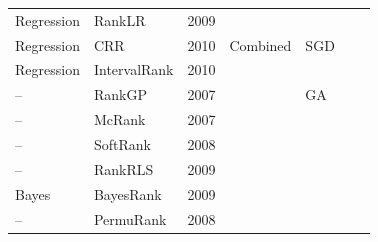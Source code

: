 \begin{table}[ht]
\begin{tabular}{|l|l|l|l|l|l|l|}
      Regression & RankLR\cite{sculley2009large} & 2009 & & & &\\
      Regression & CRR\cite{sculley2010combined} & 2010 & Combined & SGD & &\\
      Regression & IntervalRank\cite{moon2010intervalrank} & 2010 & & & &\\
      -- & RankGP\cite{yeh2007learning} & 2007 & & GA & &\\
      -- & McRank\cite{li2007mcrank} & 2007 & & & &\\
      -- & SoftRank\cite{taylor2008softrank} & 2008 & & &\\
      -- & RankRLS\cite{pahikkala2009efficient}  & 2009 & & & &\\
      Bayes & BayesRank\cite{kuo2009learning}  & 2009 & & & &\\
      -- & PermuRank\cite{xu2008directly} & 2008& & & &\\
      \hline
    \end{tabular}
\end{table}

